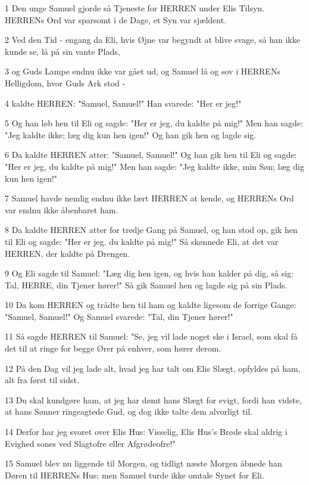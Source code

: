 \par 1 Den unge Samuel gjorde så Tjeneste for HERREN under Elis Tilsyn. HERRENs Ord var sparsomt i de Dage, et Syn var sjældent.
\par 2 Ved den Tid - engang da Eli, hvis Øjne var begyndt at blive svage, så han ikke kunde se, lå på sin vante Plads,
\par 3 og Guds Lampe endnu ikke var gået ud, og Samuel lå og sov i HERRENs Helligdom, hvor Guds Ark stod -
\par 4 kaldte HERREN: "Samuel, Samuel!" Han svarede: "Her er jeg!"
\par 5 Og han løb hen til Eli og sagde: "Her er jeg, du kaldte på mig!" Men han sagde: "Jeg kaldte ikke; læg dig kun hen igen!" Og han gik hen og lagde sig.
\par 6 Da kaldte HERREN atter: "Samuel, Samuel!" Og han gik hen til Eli og sagde: "Her er jeg, du kaldte på mig!" Men han sagde: "Jeg kaldte ikke, min Søn; læg dig kun hen igen!"
\par 7 Samuel havde nemlig endnu ikke lært HERREN at kende, og HERRENs Ord var endnu ikke åbenbaret ham.
\par 8 Da kaldte HERREN atter for tredje Gang på Samuel, og han stod op, gik hen til Eli og sagde: "Her er jeg, du kaldte på mig!" Så skønnede Eli, at det var HERREN, der kaldte på Drengen.
\par 9 Og Eli sagde til Samuel: "Læg dig hen igen, og hvis han kalder på dig, så sig: Tal, HERRE, din Tjener hører!" Så gik Samuel hen og lagde sig på sin Plads.
\par 10 Da kom HERREN og trådte hen til ham og kaldte ligesom de forrige Gange: "Samuel, Samuel!" Og Samuel svarede: "Tal, din Tjener hører!"
\par 11 Så sagde HERREN til Samuel: "Se, jeg vil lade noget ske i Israel, som skal få det til at ringe for begge Ører på enhver, som hører derom.
\par 12 På den Dag vil jeg lade alt, hvad jeg har talt om Elis Slægt, opfyldes på ham, alt fra først til sidst.
\par 13 Du skal kundgøre ham, at jeg har dømt hans Slægt for evigt, fordi han vidste, at hans Sønner ringeagtede Gud, og dog ikke talte dem alvorligt til.
\par 14 Derfor har jeg svoret over Elis Hus: Visselig, Elis Hus's Brøde skal aldrig i Evighed sones ved Slagtofre eller Afgrødeofre!"
\par 15 Samuel blev nu liggende til Morgen, og tidligt næste Morgen åbnede han Døren til HERRENs Hus; men Samuel turde ikke omtale Synet for Eli.
